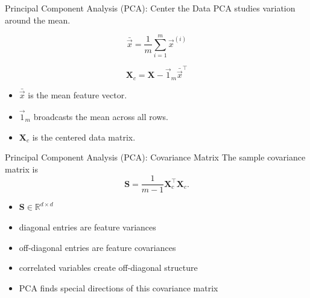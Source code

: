 \documentclass[aspectratio=169]{beamer}
\newcommand{\mat}[1]{\mathbf{#1}}
\newcommand{\vct}[1]{\vec{#1}}
\begin{document}
\begin{frame}{Principal Component Analysis (PCA): Center the Data}
\small
PCA studies variation around the mean.

\vspace{0.5em}
\begin{equation*}
    \bar{\vct{x}}
    =
    \frac{1}{m}\sum_{i=1}^{m}\vct{x}^{(i)}
\end{equation*}

\vspace{0.4em}
\begin{equation*}
    \mat{X}_{c}
    =
    \mat{X}-\vct{1}_{m}\bar{\vct{x}}^{\top}
\end{equation*}

\vspace{0.6em}
\begin{itemize}
\item $\bar{\vct{x}}$ is the mean feature vector.
\item $\vct{1}_{m}$ broadcasts the mean across all rows.
\item $\mat{X}_c$ is the centered data matrix.
\end{itemize}
\end{frame}

\begin{frame}{Principal Component Analysis (PCA): Covariance Matrix}
\small
The sample covariance matrix is
\begin{equation*}
    \mat{S}
    =
    \frac{1}{m-1}\mat{X}_{c}^{\top}\mat{X}_{c}.
\end{equation*}

\begin{itemize}
\item $\mat{S}\in\mathbb{R}^{d\times d}$
\item diagonal entries are feature variances
\item off-diagonal entries are feature covariances
\item correlated variables create off-diagonal structure
\item PCA finds special directions of this covariance matrix
\end{itemize}
\end{frame}
\end{document}

